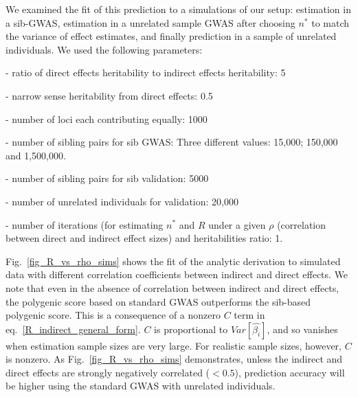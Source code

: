 \documentclass[hidelinks, 12pt]{article}
\begin{document}
We examined the fit of this prediction to a simulations of our setup: estimation in a sib-GWAS, estimation in a unrelated sample GWAS after choosing $n^*$ to match the variance of effect estimates, and finally prediction in a sample of unrelated individuals.  We used the following parameters:


- ratio of direct effects heritability to indirect effects heritability: 5

- narrow sense heritability from direct effects: 0.5

- number of loci each contributing equally: 1000

- number of sibling pairs for sib GWAS: Three different values: 15,000; 150,000 and 1,500,000. 

- number of sibling pairs for sib validation: 5000 

- number of unrelated individuals for validation: 20,000

- number of iterations (for estimating $n^*$ and $R$ under a given $\rho$ (correlation between direct and indirect effect sizes) and heritabilities ratio: 1.

\vspace{0.5cm}
Fig.~\ref{fig_R_vs_rho_sims} shows the fit of the analytic derivation to simulated data with different correlation coefficients between indirect and direct effects.  We note that even in the absence of correlation between indirect and direct effects, the polygenic score based on standard GWAS outperforms the sib-based polygenic score.  This is a consequence of a nonzero $C$ term in eq.~\ref{R_indirect_general_form}.  $C$ is proportional to $Var[\hat{\beta_i}]$, and so vanishes when estimation sample sizes are very large. For realistic sample sizes, however, $C$ is nonzero.  As Fig.~\ref{fig_R_vs_rho_sims} demonstrates, unless the indirect and direct effects are strongly negatively correlated ($<0.5$), prediction accuracy will be higher using the standard GWAS with unrelated individuals.
\end{document}
